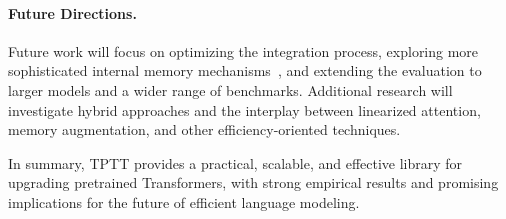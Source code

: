 \documentclass[10pt,a4paper]{article}
\begin{document}
\paragraph{Future Directions.}
Future work will focus on optimizing the integration process, exploring more sophisticated internal memory mechanisms~\cite{behrouz2024titans}, and extending the evaluation to larger models and a wider range of benchmarks. Additional research will investigate hybrid approaches and the interplay between linearized attention, memory augmentation, and other efficiency-oriented techniques.

In summary, TPTT provides a practical, scalable, and effective library for upgrading pretrained Transformers, with strong empirical results and promising implications for the future of efficient language modeling.




\end{document}
